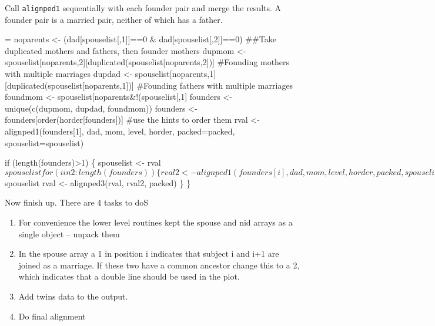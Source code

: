 \documentclass{article}
\begin{document}
Call \Verb!alignped1! sequentially with each founder pair and merge the
results.  
A founder pair is a married pair, neither of which has a father.

\begin{nwchunk}
=
 noparents <- (dad[spouselist[,1]]==0 & dad[spouselist[,2]]==0)
  ##Take duplicated mothers and fathers, then founder mothers
 dupmom <- spouselist[noparents,2][duplicated(spouselist[noparents,2])] #Founding mothers with multiple marriages
 dupdad <- spouselist[noparents,1][duplicated(spouselist[noparents,1])] #Founding fathers with multiple marriages
 foundmom <- spouselist[noparents&!(spouselist[,1] %
 founders <-  unique(c(dupmom, dupdad, foundmom))    
 founders <-  founders[order(horder[founders])]  #use the hints to order them
 rval <- alignped1(founders[1], dad, mom, level, horder, 
                           packed=packed, spouselist=spouselist)
 
 if (length(founders)>1) \{
     spouselist <- rval$spouselist
     for (i in 2:length(founders)) \{
         rval2 <- alignped1(founders[i], dad, mom,
                            level, horder, packed, spouselist)
         spouselist <- rval2$spouselist
         rval <- alignped3(rval, rval2, packed)
         \}
     \}
\end{nwchunk}

Now finish up.  
There are 4 tasks to doS
\begin{enumerate}
  \item For convenience the lower level routines kept the spouse
    and nid arrays as a single object -- unpack them
  \item In the spouse array a 1 in position i indicates that subject
    i and i+1 are joined as a marriage.  If these two have a common
    ancestor change this to a 2, which indicates that a double line
    should be used in the plot.
  \item Add twins data to the output.
  \item Do final alignment
\end{enumerate}

\end{document}
